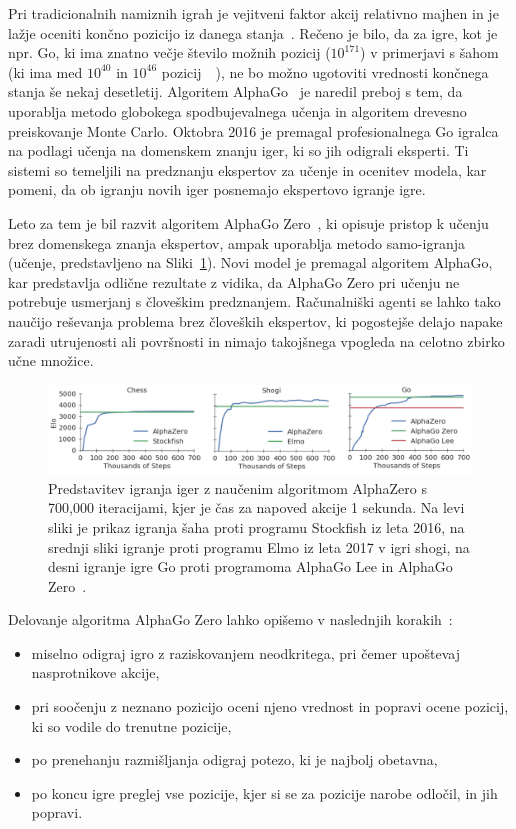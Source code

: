 \documentclass[a4paper, 12pt]{book}
\begin{document}
Pri tradicionalnih namiznih igrah je vejitveni faktor akcij relativno majhen in je lažje oceniti končno pozicijo iz danega stanja~\cite{wiki:AlphaGo}.
Rečeno je bilo, da za igre, kot je npr. Go, ki ima znatno večje število možnih pozicij ($10^{171}$) v primerjavi s šahom (ki ima med $10^{40}$ in $10^{46}$ pozicij~\cite{chinchalkar1996upper}~\cite{steinerberger2015number}), ne bo možno ugotoviti vrednosti končnega stanja še nekaj desetletij.
Algoritem AlphaGo~\cite{silver2016mastering} je naredil preboj s tem, da uporablja metodo globokega spodbujevalnega učenja in algoritem drevesno preiskovanje Monte Carlo. 
Oktobra 2016 je premagal profesionalnega Go igralca na podlagi učenja na domenskem znanju iger, ki so jih odigrali eksperti.
Ti sistemi so temeljili na predznanju ekspertov za učenje in ocenitev modela, kar pomeni, da ob igranju novih iger posnemajo ekspertovo igranje igre.

Leto za tem je bil razvit algoritem AlphaGo Zero~\cite{silver2017mastering}, ki opisuje pristop k učenju brez domenskega znanja ekspertov, ampak uporablja metodo samo-igranja (učenje, predstavljeno na Sliki~\ref{picCompareGo}). 
Novi model je premagal algoritem AlphaGo, kar predstavlja odlične rezultate z vidika, da AlphaGo Zero pri učenju ne potrebuje usmerjanj s človeškim predznanjem.
Računalniški agenti se lahko tako naučijo reševanja problema brez človeških ekspertov, ki pogostejše delajo napake zaradi utrujenosti ali površnosti in nimajo takojšnega vpogleda na celotno zbirko učne množice.

\begin{figure}[h!]
	\begin{center}
		\includegraphics[width=1\textwidth]{photos/go.pdf}
	\end{center}
	\caption{Predstavitev igranja iger z naučenim algoritmom AlphaZero s 700,000 iteracijami, kjer je čas za napoved akcije 1 sekunda.
		Na levi sliki je prikaz igranja šaha proti programu Stockfish iz leta 2016, na srednji sliki igranje proti programu Elmo iz leta 2017 v igri shogi, na desni igranje igre Go proti programoma AlphaGo Lee in AlphaGo Zero~{\cite{silver2017mastering}}.
 }
	\label{picCompareGo}
\end{figure}
\noindent
Delovanje algoritma AlphaGo Zero lahko opišemo v naslednjih korakih~\cite{guid}:
\begin{itemize}
	\item miselno odigraj igro z raziskovanjem neodkritega, pri čemer upoštevaj nasprotnikove akcije,
	\item pri soočenju z neznano pozicijo oceni njeno vrednost in popravi ocene pozicij, ki so vodile do trenutne pozicije,
	\item po prenehanju razmišljanja odigraj potezo, ki je najbolj obetavna,
	\item po koncu igre preglej vse pozicije, kjer si se za pozicije narobe odločil, in jih popravi.
\end{itemize}
\end{document}
